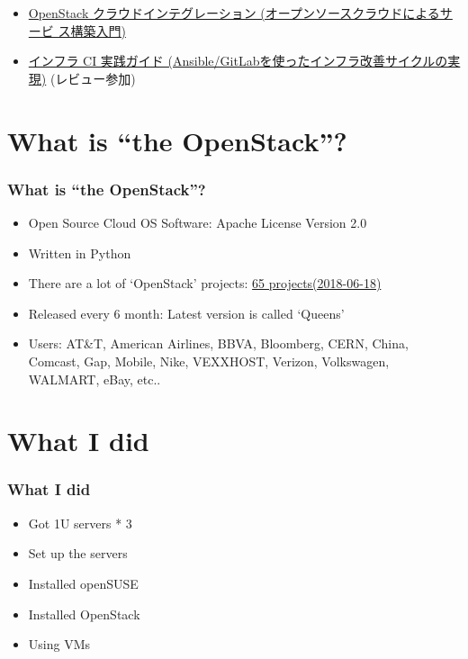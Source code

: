 \documentclass[aspectratio=169,11pt,hyperref={colorlinks=true}]{beamer}
\begin{document}
\begin{frame}
\begin{itemize}
      \begin{itemize}
      \item \href{https://www.amazon.co.jp/dp/4798139785/}{OpenStack
        クラウドインテグレーション (オープンソースクラウドによるサービ
        ス構築入門)}
      \item \href{https://www.amazon.co.jp/dp/4798155128/}{インフラ CI
        実践ガイド (Ansible/GitLabを使ったインフラ改善サイクルの実
        現)} (レビュー参加)
      \end{itemize}
  \end{itemize}
\end{frame}

\section{What is ``the OpenStack''?}
\begin{frame}
  \frametitle{What is ``the OpenStack''?}
  \begin{itemize}
    \item Open Source Cloud OS Software: Apache License Version 2.0
    \item Written in Python
    \item There are a lot of `OpenStack' projects: \href{http://governance.openstack.org/reference/projects/index.html}{65 projects(2018-06-18)}
    \item Released every 6 month: Latest version is called `Queens'
    \item Users: AT\&T, American Airlines, BBVA, Bloomberg, CERN,
      China, Comcast, Gap, Mobile, Nike, VEXXHOST, Verizon,
      Volkswagen, WALMART, eBay, etc..
  \end{itemize}
\end{frame}

\section{What I did}
\begin{frame}
  \frametitle{What I did}
  \begin{itemize}
    \item Got 1U servers * 3
    \item Set up the servers
    \item Installed openSUSE
    \item Installed OpenStack
    \item Using VMs
  \end{itemize}
\end{frame}
\end{document}
